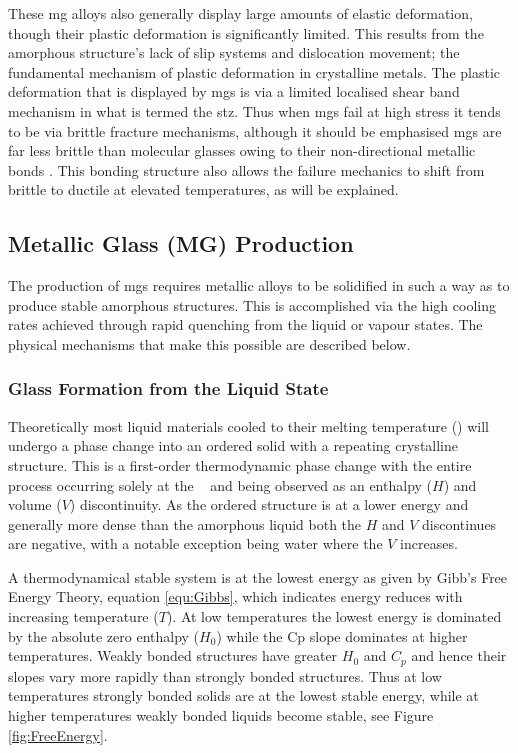 \documentclass[a4paper,12pt,oneside]{report}%
\begin{document}
These \gls{mg} alloys also generally display large amounts of elastic deformation, though their plastic deformation is significantly limited. This results from the amorphous structure's lack of slip systems and dislocation movement; the fundamental mechanism of plastic deformation in crystalline metals. The plastic deformation that is displayed by \glspl{mg} is via a limited localised shear band mechanism in what is termed the \gls{stz}.  Thus when \glspl{mg} fail at high stress it tends to be via brittle fracture mechanisms, although it should be emphasised \glspl{mg} are far less brittle than molecular glasses owing to their non-directional metallic bonds \cite{Greer2013}. This bonding structure also allows the failure mechanics to shift from brittle to ductile at elevated temperatures, as will be explained.

\subsection{Metallic Glass (MG) Production}
The production of \glspl{mg} requires metallic alloys to be solidified in such a way as to produce stable amorphous structures. This is accomplished via the high cooling rates achieved through rapid quenching from the liquid or vapour states. The physical mechanisms that make this possible are described below. 

\subsubsection{Glass Formation from the Liquid State} \label{sec:Gibbs}
Theoretically most liquid materials cooled to their melting temperature (\Tm) will undergo a phase change into an ordered solid with a repeating crystalline structure. This is a first-order thermodynamic phase change with the entire process occurring solely at the \Tm~ and being observed as an enthalpy ($H$) and volume ($V$) discontinuity. As the ordered structure is at a lower energy and generally more dense than the amorphous liquid both the $H$ and $V$ discontinues are negative, with a notable exception being water where the $V$ increases.
 
A thermodynamical stable system is at the lowest energy as given by Gibb's Free Energy Theory, equation \ref{equ:Gibbs}, which indicates energy reduces with increasing temperature ($T$). At low temperatures the lowest energy is dominated by the absolute zero enthalpy ($H_{0}$) while the \gls{Cp} slope dominates at higher temperatures. Weakly bonded structures have greater $H_{0}$ and $C_{p}$ and hence their slopes vary more rapidly than strongly bonded structures. Thus at low temperatures strongly bonded solids are at the lowest stable energy, while at higher temperatures weakly bonded liquids become stable, see Figure \ref{fig:FreeEnergy}. 
\end{document}
